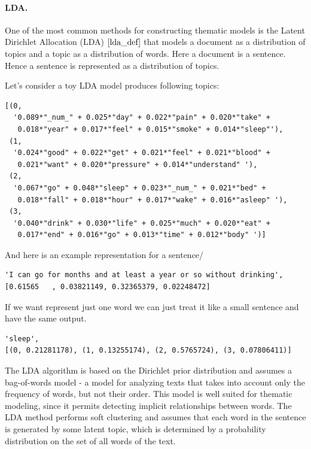 \documentclass[11pt]{article}
\begin{document}

\paragraph{LDA.}

One of the most common methods for constructing thematic models is the Latent Dirichlet Allocation (LDA) $\cite{lda_def}$ that models a document as a distribution of topics and a topic as a distribution of words. Here a document is a sentence. Hence a sentence is represented as a distribution of topics. 

Let's consider a toy LDA model produces following topics:

\begin{lstlisting}
[(0,
  '0.089*"_num_" + 0.025*"day" + 0.022*"pain" + 0.020*"take" + 
   0.018*"year" + 0.017*"feel" + 0.015*"smoke" + 0.014*"sleep"'),
 (1,
  '0.024*"good" + 0.022*"get" + 0.021*"feel" + 0.021*"blood" + 
   0.021*"want" + 0.020*"pressure" + 0.014*"understand" '),
 (2,
  '0.067*"go" + 0.048*"sleep" + 0.023*"_num_" + 0.021*"bed" + 
   0.018*"fall" + 0.018*"hour" + 0.017*"wake" + 0.016*"asleep" '),
 (3,
  '0.040*"drink" + 0.030*"life" + 0.025*"much" + 0.020*"eat" + 
   0.017*"end" + 0.016*"go" + 0.013*"time" + 0.012*"body" ')]
\end{lstlisting}


And here is an example representation for a  sentence/ 

\begin{lstlisting}
'I can go for months and at least a year or so without drinking',
[0.61565   , 0.03821149, 0.32365379, 0.02248472]
\end{lstlisting}

If we want represent just one word we can just treat it like a small sentence and have the same output.
\begin{lstlisting}
'sleep',
[(0, 0.21281178), (1, 0.13255174), (2, 0.5765724), (3, 0.07806411)]
\end{lstlisting}

The LDA algorithm is based on the Dirichlet prior distribution and
assumes a bag-of-words model - a model for analyzing texts
that takes into account only the frequency of words, but not their
order. This model is well suited for thematic modeling, since it
permits detecting implicit relationships between words. The LDA
method performs soft clustering and assumes that each word in the
sentence is generated by some latent topic, which is determined by a
probability distribution on the set of all words of the text.
\end{document}
